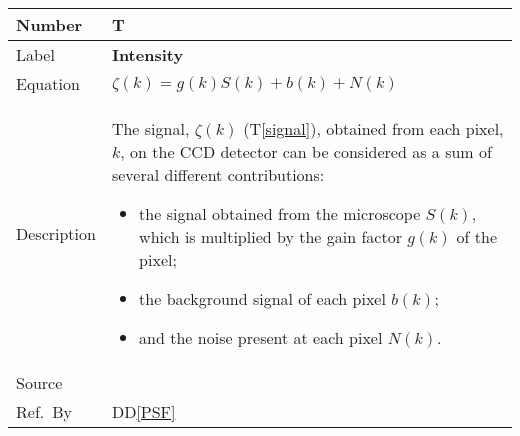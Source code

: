 \documentclass[12pt]{article}
\newcommand{\colAwidth}{0.13\textwidth}
\newcommand{\colBwidth}{0.82\textwidth}
\newcommand{\ddref}[1]{DD\ref{#1}}
\newcounter{theorynum} %
\newcommand{\tref}[1]{T\ref{#1}}
\begin{document}
\noindent
\begin{minipage}{\textwidth}
	\renewcommand*{\arraystretch}{1.5}
	\begin{tabular}{| p{\colAwidth} | p{\colBwidth}|}
		  \hline
		  \rowcolor[gray]{0.9}
		  Number& T{theorynum}\thetheorynum \label{intensity}\\
		  \hline
		  Label&\bf Intensity \\
		  \hline
		  Equation& $\zeta(k) = g(k) S(k) + b(k) + N(k)$ \\
		  \hline
		  Description & The signal, $\zeta(k)$ (\tref{signal}), obtained from each pixel, $k$, on the CCD detector can be considered as a sum of several different contributions: 
		  \begin{itemize}
			\item the signal obtained from the microscope $S(k)$, which is multiplied by the gain factor $g(k)$ of the pixel; 
			\item the background signal of each pixel $b(k)$; 
			\item and the noise present at each pixel $N(k)$.
		  \end{itemize}\\
		  \hline
		  Source & \cite{zuo_electron_2000}\\
		  \hline
		  Ref.\ By & \ddref{PSF} \\
		  \hline
	\end{tabular}
\end{minipage}\\

~\newline
\end{document}

